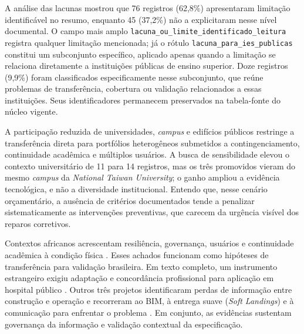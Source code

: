 A análise das lacunas mostrou que 76 registros (62,8\%) apresentaram limitação identificável no resumo, enquanto 45 (37,2\%) não a explicitaram nesse nível documental. O campo mais amplo \texttt{lacuna\_\allowbreak ou\_\allowbreak limite\_\allowbreak identificado\_\allowbreak leitura} registra qualquer limitação mencionada; já o rótulo \texttt{lacuna\_\allowbreak para\_\allowbreak ies\_\allowbreak publicas} constitui um subconjunto específico, aplicado apenas quando a limitação se relaciona diretamente a instituições públicas de ensino superior. Doze registros (9,9\%) foram classificados especificamente nesse subconjunto, que reúne problemas de transferência, cobertura ou validação relacionados a essas instituições. Seus identificadores permanecem preservados na tabela-fonte do núcleo vigente.

A participação reduzida de universidades, \textit{campus} e edifícios públicos restringe a transferência direta para portfólios heterogêneos submetidos a contingenciamento, continuidade acadêmica e múltiplos usuários. A busca de sensibilidade elevou o contexto universitário de 11 para 14 registros, mas os três promovidos vieram do mesmo \textit{campus} da \textit{National Taiwan University}; o ganho ampliou a evidência tecnológica, e não a diversidade institucional. Entendo que, nesse cenário orçamentário, a ausência de critérios documentados tende a penalizar sistematicamente as intervenções preventivas, que carecem da urgência visível dos reparos corretivos.

Contextos africanos acrescentam resiliência, governança, usuários e continuidade acadêmica à condição física \parencite{awuzie_fmuniversidades_2017,ndukuba_resilienciainstitucional_2025}. Esses achados funcionam como hipóteses de transferência para validação brasileira. Em texto completo, um instrumento estrangeiro exigiu adaptação e concordância profissional para aplicação em hospital público \parencite{talib_hospitalfm_2013}. Outros três projetos identificaram perdas de informação entre construção e operação e recorreram ao BIM, à entrega suave (\textit{Soft Landings}) e à comunicação para enfrentar o problema \parencite{tan_fluxoinformacao_2018}. Em conjunto, as evidências sustentam governança da informação e validação contextual da especificação.
